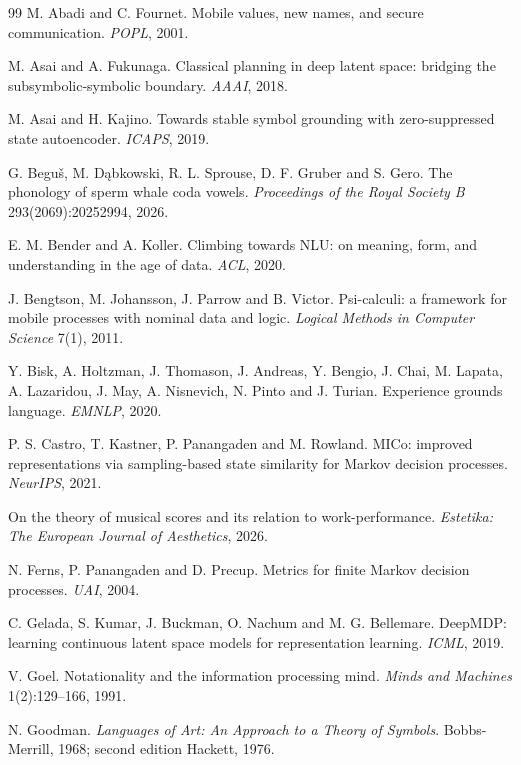 \begin{thebibliography}{99}
 M. Abadi and C. Fournet. Mobile values, new names, and secure
communication. \emph{POPL}, 2001.

 M. Asai and A. Fukunaga. Classical planning in deep latent space:
bridging the subsymbolic-symbolic boundary. \emph{AAAI}, 2018.

 M. Asai and H. Kajino. Towards stable symbol grounding with
zero-suppressed state autoencoder. \emph{ICAPS}, 2019.

 G. Begu\v{s}, M. D\k{a}bkowski, R. L. Sprouse, D. F. Gruber and
S. Gero. The phonology of sperm whale coda vowels. \emph{Proceedings of the Royal
Society B} 293(2069):20252994, 2026.

 E. M. Bender and A. Koller. Climbing towards NLU: on meaning,
form, and understanding in the age of data. \emph{ACL}, 2020.

 J. Bengtson, M. Johansson, J. Parrow and B. Victor. Psi-calculi: a
framework for mobile processes with nominal data and logic. \emph{Logical Methods in
Computer Science} 7(1), 2011.

 Y. Bisk, A. Holtzman, J. Thomason, J. Andreas, Y. Bengio, J. Chai,
M. Lapata, A. Lazaridou, J. May, A. Nisnevich, N. Pinto and J. Turian. Experience grounds
language. \emph{EMNLP}, 2020.

 P. S. Castro, T. Kastner, P. Panangaden and M. Rowland. MICo:
improved representations via sampling-based state similarity for Markov decision
processes. \emph{NeurIPS}, 2021.

 On the theory of musical scores and its relation to
work-performance. \emph{Estetika: The European Journal of Aesthetics}, 2026.

 N. Ferns, P. Panangaden and D. Precup. Metrics for finite Markov
decision processes. \emph{UAI}, 2004.

 C. Gelada, S. Kumar, J. Buckman, O. Nachum and M. G. Bellemare.
DeepMDP: learning continuous latent space models for representation learning.
\emph{ICML}, 2019.

 V. Goel. Notationality and the information processing mind.
\emph{Minds and Machines} 1(2):129--166, 1991.

 N. Goodman. \emph{Languages of Art: An Approach to a Theory of
Symbols}. Bobbs-Merrill, 1968; second edition Hackett, 1976.


\end{thebibliography}
